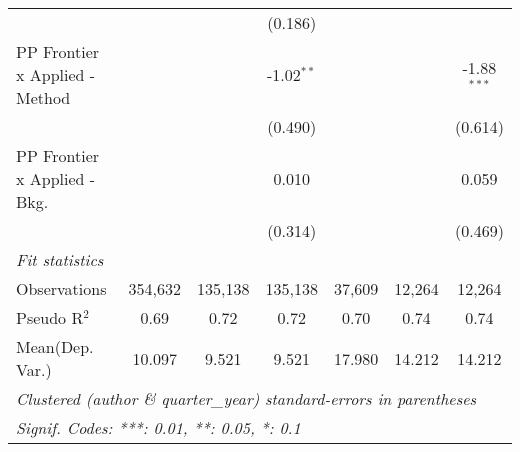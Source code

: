 \begin{tabular}{lcccccc}
                                  &                &               & (0.186)        &               &         &   \\   
   PP Frontier x Applied - Method &                &               & -1.02$^{**}$   &               &         & -1.88$^{***}$\\   
                                  &                &               & (0.490)        &               &         & (0.614)\\   
   PP Frontier x Applied - Bkg.   &                &               & 0.010          &               &         & 0.059\\   
                                  &                &               & (0.314)        &               &         & (0.469)\\   
   \midrule
   \emph{Fit statistics}\\
   Observations                   & 354,632        & 135,138       & 135,138        & 37,609        & 12,264  & 12,264\\  
   Pseudo R$^2$                   & 0.69           & 0.72          & 0.72           & 0.70          & 0.74    & 0.74\\  
Mean(Dep. Var.) & 10.097 & 9.521 & 9.521 & 17.980 & 14.212 & 14.212 \\
   \midrule \midrule
   \multicolumn{7}{l}{\emph{Clustered (author \& quarter\_year) standard-errors in parentheses}}\\
   \multicolumn{7}{l}{\emph{Signif. Codes: ***: 0.01, **: 0.05, *: 0.1}}\\
\end{tabular}
\par\endgroup
